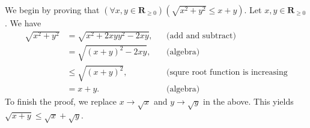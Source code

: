 \documentclass[12pt, fleqn, answers]{exam}
\newcommand{\reals}{\mathbf{R}}
\begin{document}
\begin{questions}
\begin{solution} We begin by proving that $\left(\forall x,y \in \reals_{\geq 0}\right)(\sqrt{x^2 + y^2} \leq x + y) $.
Let $x,y \in \reals_{\geq 0}$. We have
\begin{align*}
\sqrt{x^2 + y^2} &= \sqrt{x^2 + 2 x y  y^2 - 2 x y}, &&\mbox{(add and subtract)} \\
                           &= \sqrt{(x + y)^2 - 2 x y}, &&\mbox{(algebra)} \\
                           &\leq \sqrt{(x + y)^2}, &&\mbox{(squre root function is increasing} \\
                           &= x + y.  &&\mbox{(algebra)} 
\end{align*}
To finish the proof, we replace $x \to \sqrt{x}$ and  $y \to \sqrt{y}$ in the above. This yields
$\sqrt{x+y} \leq \sqrt{x} + \sqrt{y}$.

\end{solution}
\end{questions}
\end{document}
